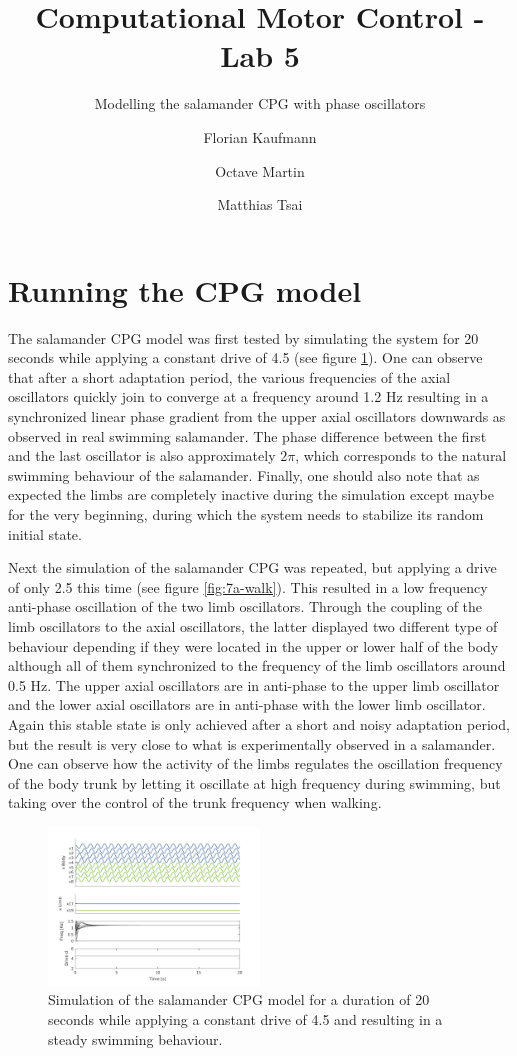 \documentclass[a4paper]{scrartcl}
\title{Computational Motor Control - Lab 5}
\subtitle{Modelling the salamander CPG with phase oscillators}
\author{Florian Kaufmann \and Octave Martin \and Matthias Tsai}
\begin{document}
{\twocolumn

\setlength{\columnsep}{0.5cm}
\maketitle

\section{Running the CPG model}

The salamander CPG model was first tested by simulating the system for 20 seconds while applying a constant drive of 4.5 (see figure \ref{fig:7a-swim}). One can observe that after a short adaptation period, the various frequencies of the axial oscillators quickly join to converge at a frequency around 1.2 Hz resulting in a synchronized linear phase gradient from the upper axial oscillators downwards as observed in real swimming salamander. The phase difference between the first and the last oscillator is also approximately $2\pi$, which corresponds to the natural swimming behaviour of the salamander. Finally, one should also note that as expected the limbs are completely inactive during the simulation except maybe for the very beginning, during which the system needs to stabilize its random initial state.

Next the simulation of the salamander CPG was repeated, but applying a drive of only 2.5 this time (see figure \ref{fig:7a-walk}). This resulted in a low frequency anti-phase oscillation of the two limb oscillators. Through the coupling of the limb oscillators to the axial oscillators, the latter displayed two different type of behaviour depending if they were located in the upper or lower half of the body although all of them synchronized to the frequency of the limb oscillators around 0.5 Hz. The upper axial oscillators are in anti-phase to the upper limb oscillator and the lower axial oscillators are in anti-phase with the lower limb oscillator. Again this stable state is only achieved after a short and noisy adaptation period, but the result is very close to what is experimentally observed in a salamander. One can observe how the activity of the limbs regulates the oscillation frequency of the body trunk by letting it oscillate at high frequency during swimming, but taking over the control of the trunk frequency when walking.

\begin{figure}[!h]	
	\includegraphics[width=0.5\textwidth]{fig/figure7a-swim.png}
	\caption{Simulation of the salamander CPG model for a duration of 20 seconds while applying a constant drive of 4.5 and resulting in a steady swimming behaviour.}
	\label{fig:7a-swim}
\end{figure}

}
\end{document}
